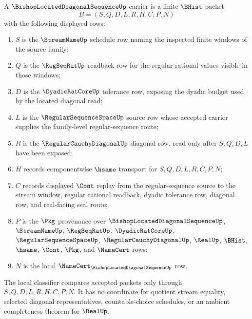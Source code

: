 \begin{definition}
\label{def:bishop-located-diagonal-sequence-carrier}
A $\BishopLocatedDiagonalSequenceUp$ carrier is a finite $\BHist$ packet
$$
B=(S,Q,D,L,R,H,C,P,N)
$$
with the following displayed rows:
\begin{enumerate}
\item $S$ is the $\StreamNameUp$ schedule row naming the inspected finite windows of the source family;
\item $Q$ is the $\RegSeqRatUp$ readback row for the regular rational values visible in those windows;
\item $D$ is the $\DyadicRatCoreUp$ tolerance row, exposing the dyadic budget used by the located diagonal read;
\item $L$ is the $\RegularSequenceSpaceUp$ source row whose accepted carrier supplies the family-level regular-sequence route;
\item $R$ is the $\RegularCauchyDiagonalUp$ diagonal row, read only after $S,Q,D,L$ have been exposed;
\item $H$ records componentwise $\hsame$ transport for $S,Q,D,L,R,C,P,N$;
\item $C$ records displayed $\Cont$ replay from the regular-sequence source to the stream window, regular rational readback, dyadic tolerance row, diagonal row, and real-facing seal route;
\item $P$ is the $\Pkg$ provenance over $\BishopLocatedDiagonalSequenceUp$, $\StreamNameUp$, $\RegSeqRatUp$, $\DyadicRatCoreUp$, $\RegularSequenceSpaceUp$, $\RegularCauchyDiagonalUp$, $\RealUp$, $\BHist$, $\hsame$, $\Cont$, $\Pkg$, and $\NameCert$ rows;
\item $N$ is the local $\NameCert_{\BishopLocatedDiagonalSequenceUp}$ row.
\end{enumerate}
The local classifier compares accepted packets only through $S,Q,D,L,R,H,C,P,N$. It has no coordinate for quotient stream equality, selected diagonal representatives, countable-choice schedules, or an ambient completeness theorem for $\RealUp$.
\end{definition}


